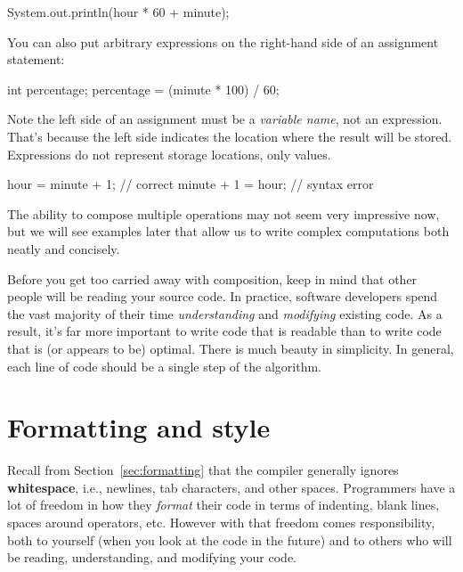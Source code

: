 \begin{code}
    System.out.println(hour * 60 + minute);
\end{code}

You can also put arbitrary expressions on the right-hand side of an assignment statement:

\begin{code}
    int percentage;
    percentage = (minute * 100) / 60;
\end{code}

Note the left side of an assignment must be a {\em variable name}, not an expression.
That's because the left side indicates the location where the result will be stored.
Expressions do not represent storage locations, only values.

\begin{code}
    hour = minute + 1;  // correct
    minute + 1 = hour;  // syntax error
\end{code}


The ability to compose multiple operations may not seem very impressive now, but we will see examples later that allow us to write complex computations both neatly and concisely.

Before you get too carried away with composition, keep in mind that other people will be reading your source code.
In practice, software developers spend the vast majority of their time {\em understanding} and {\em modifying} existing code.
As a result, it's far more important to write code that is readable than to write code that is (or appears to be) optimal.
There is much beauty in simplicity.
In general, each line of code should be a single step of the algorithm.


\section{Formatting and style}


Recall from Section~\ref{sec:formatting} that the compiler generally ignores {\bf whitespace}, i.e., newlines, tab characters, and other spaces.
Programmers have a lot of freedom in how they {\em format} their code in terms of indenting, blank lines, spaces around operators, etc.
However with that freedom comes responsibility, both to yourself (when you look at the code in the future) and to others who will be reading, understanding, and modifying your code.

